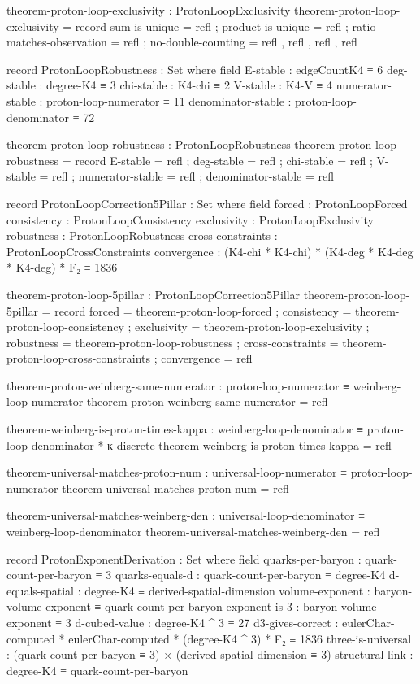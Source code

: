 \documentclass[11pt,a4paper]{book}
\begin{document}
\begin{code}
theorem-proton-loop-exclusivity : ProtonLoopExclusivity
theorem-proton-loop-exclusivity = record
  { sum-is-unique = refl
  ; product-is-unique = refl
  ; ratio-matches-observation = refl
  ; no-double-counting = refl , refl , refl , refl
  }

record ProtonLoopRobustness : Set where
  field
    E-stable : edgeCountK4 ≡ 6
    deg-stable : degree-K4 ≡ 3
    chi-stable : K4-chi ≡ 2
    V-stable : K4-V ≡ 4
    numerator-stable : proton-loop-numerator ≡ 11
    denominator-stable : proton-loop-denominator ≡ 72

theorem-proton-loop-robustness : ProtonLoopRobustness
theorem-proton-loop-robustness = record
  { E-stable = refl
  ; deg-stable = refl
  ; chi-stable = refl
  ; V-stable = refl
  ; numerator-stable = refl
  ; denominator-stable = refl
  }

record ProtonLoopCorrection5Pillar : Set where
  field
    forced : ProtonLoopForced
    consistency : ProtonLoopConsistency
    exclusivity : ProtonLoopExclusivity
    robustness : ProtonLoopRobustness
    cross-constraints : ProtonLoopCrossConstraints
    convergence : (K4-chi * K4-chi) * (K4-deg * K4-deg * K4-deg) * F₂ ≡ 1836

theorem-proton-loop-5pillar : ProtonLoopCorrection5Pillar
theorem-proton-loop-5pillar = record
  { forced = theorem-proton-loop-forced
  ; consistency = theorem-proton-loop-consistency
  ; exclusivity = theorem-proton-loop-exclusivity
  ; robustness = theorem-proton-loop-robustness
  ; cross-constraints = theorem-proton-loop-cross-constraints
  ; convergence = refl
  }

theorem-proton-weinberg-same-numerator : proton-loop-numerator ≡ weinberg-loop-numerator
theorem-proton-weinberg-same-numerator = refl

theorem-weinberg-is-proton-times-kappa : weinberg-loop-denominator ≡ proton-loop-denominator * κ-discrete
theorem-weinberg-is-proton-times-kappa = refl

theorem-universal-matches-proton-num : universal-loop-numerator ≡ proton-loop-numerator
theorem-universal-matches-proton-num = refl

theorem-universal-matches-weinberg-den : universal-loop-denominator ≡ weinberg-loop-denominator
theorem-universal-matches-weinberg-den = refl

record ProtonExponentDerivation : Set where
  field
    quarks-per-baryon : quark-count-per-baryon ≡ 3
    quarks-equals-d   : quark-count-per-baryon ≡ degree-K4
    d-equals-spatial  : degree-K4 ≡ derived-spatial-dimension
    volume-exponent   : baryon-volume-exponent ≡ quark-count-per-baryon
    exponent-is-3     : baryon-volume-exponent ≡ 3
    d-cubed-value     : degree-K4 ^ 3 ≡ 27
    d3-gives-correct  : eulerChar-computed * eulerChar-computed * (degree-K4 ^ 3) * F₂ ≡ 1836
    three-is-universal : (quark-count-per-baryon ≡ 3) × 
                         (derived-spatial-dimension ≡ 3)
    structural-link   : degree-K4 ≡ quark-count-per-baryon


\end{code}
\end{document}
